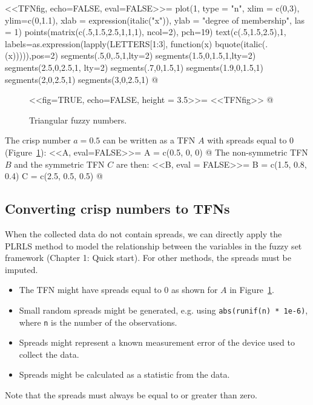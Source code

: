 \documentclass[a4paper]{article}
\begin{document}
<<TFNfig, echo=FALSE, eval=FALSE>>=
plot(1, type = "n", xlim = c(0,3), ylim=c(0,1.1), xlab = expression(italic("x")),
ylab = "degree of membership", las = 1)
points(matrix(c(.5,1.5,2.5,1,1,1), ncol=2), pch=19)
text(c(.5,1.5,2.5),1, labels=as.expression(lapply(LETTERS[1:3], function(x) bquote(italic(.(x))))),pos=2)
segments(.5,0,.5,1,lty=2)
segments(1.5,0,1.5,1,lty=2)
segments(2.5,0,2.5,1, lty=2)
segments(.7,0,1.5,1)
segments(1.9,0,1.5,1)
segments(2,0,2.5,1)
segments(3,0,2.5,1)
@

\begin{figure}[h]
	\centering
<<fig=TRUE, echo=FALSE, height = 3.5>>=
<<TFNfig>>
@
	\caption{Triangular fuzzy numbers.}
	\label{fig:TFN}
\end{figure}

The crisp number $a=0.5$ can be written as a TFN $A$ with spreads equal
to 0 (Figure~\ref{fig:TFN}):
<<A, eval=FALSE>>=
A = c(0.5, 0, 0)
@
The non-symmetric TFN $B$ and the symmetric TFN $C$ are then:
<<B, eval = FALSE>>=
B = c(1.5, 0.8, 0.4)
C = c(2.5, 0.5, 0.5)
@

\subsection{Converting crisp numbers to TFNs}

When the collected data do not contain spreads, we can directly apply the PLRLS method to model
the relationship between the variables in the fuzzy set framework (Chapter 1: Quick start). 
For other methods, the spreads must be imputed.

\begin{itemize}
\item{The TFN might have spreads equal to 0 as shown for $A$ in
Figure~\ref{fig:TFN}.}
\item{Small random spreads might be generated, e.g. using \texttt{abs(runif(n) * 1e-6)}, where
\texttt{n} is the number of the observations.}
\item{Spreads might represent a known measurement error of the device used to collect
the data.}
\item{Spreads might be calculated as a statistic from the data.}
\end{itemize}

Note that the spreads must always be equal to or greater than zero.
\end{document}
